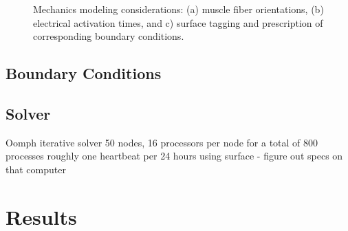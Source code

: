 \begin{figure}[ht]
{\label{fig:supp2}}
%
\caption{Mechanics modeling considerations: (a) muscle fiber orientations, (b) electrical activation times, and c) surface tagging and prescription of corresponding boundary conditions.}
\label{fig:supp}
\end{figure}

\subsection{Boundary Conditions}
\label{Boundary Conditions}

\subsection{Solver}
\label{Solver}
Oomph
iterative solver
50 nodes, 16 processors per node for a total of 800 processes
roughly one heartbeat per 24 hours
using surface - figure out specs on that computer

\section{Results}
\label{Results}


